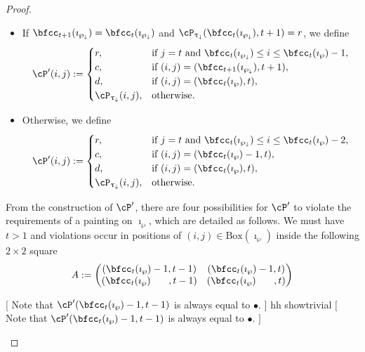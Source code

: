 \documentclass[12pt,a4paper]{amsart}
\newcommand{\trivial}[2][]{\if\relax\detokenize{#1}\relax
  {%
      \color{orange} \vspace{0em} $[$  #2 $]$
      \color{black}
  }
  \else
\ifx#1h
\ifcsname showtrivial\endcsname
{%
    \color{orange} \vspace{0em}  $[$ #2 $]$
    \color{black}
}
\fi
\else {\red Wrong argument!} \fi
\fi
}
\numberwithin{equation}{section}
\theoremstyle{remark}
\def\BOX#1{\mathrm{Box}(#1)}
\begin{document}
{\begin{proof}
\begin{description}
\begin{enumerate}[label=(\alph*)]
\begin{itemize}
              \item If $\bfcc_{t+1}(\imath_{\PPm}) = \bfcc_{t}(\imath_{\PPm})$
              and
              $\cP_{\uptaum}(\bfcc_{t}(\imath_{\PPm}),t+1) = r$,
              we define
              \[
                \cP'(i,j) := \begin{cases}
                  r ,& \text{if $j=t$ and $\bfcc_{t}(\imath_{\PPm})\leq i \leq \bfcc_{t}(\imath_{\wp})-1$},\\
                  c ,& \text{if $(i,j)=(\bfcc_{t+1}(\imath_{\PPm}),t+1)$},\\
                  d ,& \text{if $(i,j)=(\bfcc_{t}(\imath_{\wp}),t)$},\\
                  \cP_{\uptaum}(i,j) ,&\text{otherwise}.
                \end{cases}
              \]
              \item Otherwise, we define
              \[
                \cP'(i,j) := \begin{cases}
                  r ,& \text{if $j=t$ and $\bfcc_{t}(\imath_{\PPm})\leq i \leq \bfcc_{t}(\imath_{\wp})-2$},\\
                  c ,& \text{if $(i,j)=(\bfcc_{t}(\imath_{\wp})-1,t)$},\\
                  d ,& \text{if $(i,j)=(\bfcc_{t}(\imath_{\wp}),t)$},\\
                  \cP_{\uptaum}(i,j) ,&\text{otherwise}.
                \end{cases}
              \]
            \end{itemize}
          \end{enumerate}

    \item[STEP 2] From the construction of $\cP'$, there are four possibilities for $\cP'$ to violate the requirements of a painting on $\imath_{\wp}$, which are detailed as follows. We must have $t>1$ and violations occur in positions of $(i,j)\in \BOX{\imath_{\wp}}$ inside the following $2\times 2$ square
         \[
          A :=
          \begin{pmatrix}
            (\bfcc_{t}(\imath_{\wp})-1,t-1) & (\bfcc_{t}(\imath_{\wp})-1,t) \\
            (\bfcc_{t}(\imath_{\wp})\;\phantom{-1}\;,t-1) & (\bfcc_{t}(\imath_{\wp})\;\phantom{-1}\;,t) \\
          \end{pmatrix}
          \]

          \trivial[h]{
          Note that  $\cP'(\bfcc_{t}(\imath_{\wp})-1,t-1)$ is always equal to
          $\bullet$.
          }


\end{description}
\end{proof}}
\end{document}
